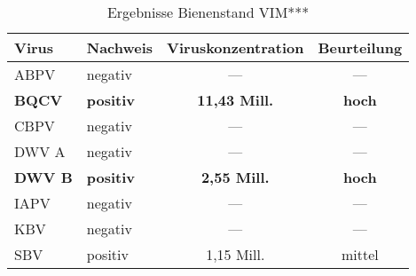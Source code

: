 \begin{table}[htp]
    \caption{Ergebnisse Bienenstand VIM***}
    \centering
    \begin{tabular}{|l|l|c|c|}
    \hline
    Virus   & Nachweis &  Viruskonzentration    & Beurteilung \\
    \hline
    ABPV    &  negativ  &   ---                 & ---\\
    \textbf{BQCV}    &  \textbf{positiv}  &   \textbf{11,43 Mill.}         & \textbf{hoch}\\
    CBPV    &  negativ  &   ---                 & ---\\
    DWV A   &  negativ  &   ---                 & ---\\
    \textbf{DWV B}   &  \textbf{positiv}  &   \textbf{2,55 Mill.}          & \textbf{hoch}\\
    IAPV    &  negativ  &   ---                 & ---\\
    KBV     &  negativ  &   ---                 & ---\\
    SBV     &  positiv  &   1,15 Mill.          & mittel\\
    \hline
    \end{tabular}
    \label{tab:i:bsp_ergebnis}
\end{table}